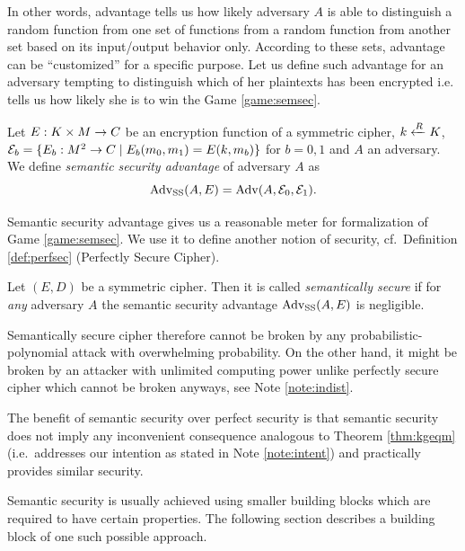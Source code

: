 In other words, advantage tells us how likely adversary $A$ is able to distinguish a random function from one set of functions from a random function from another set based on its input/output behavior only. According to these sets, advantage can be ``customized'' for a specific purpose. Let us define such advantage for an adversary tempting to distinguish which of her plaintexts has been encrypted i.e. tells us how likely she is to win the Game \ref{game:semsec}.

\begin{defn}
\label{def:ssadvant}
	Let $E: K\times M\rightarrow C$ be an encryption function of a symmetric cipher, $k\xleftarrow{R} K$, ${\cal E}_b = \{E_b:M^2\rightarrow C \mid E_b(m_0,m_1) = E(k,m_b)\}$ for $b=0,1$ and $A$ an adversary. We define {\em semantic security advantage} of adversary $A$ as
	\[
		\operatorname*{Adv_{SS}}(A,E) = \operatorname*{Adv}(A,{\cal E}_0,{\cal E}_1) .
	\]
\end{defn}

Semantic security advantage gives us a reasonable meter for formalization of Game \ref{game:semsec}. We use it to define another notion of security, cf.\ Definition \ref{def:perfsec} (Perfectly Secure Cipher).

\begin{defn}
\label{def:semsec}
	Let $(E,D)$ be a symmetric cipher. Then it is called {\em semantically secure} if for {\em any} adversary $A$ the semantic security advantage $\operatorname*{Adv_{SS}}(A,E)$ is negligible.
\end{defn}


Semantically secure cipher therefore cannot be broken by any probabilistic-polynomial attack with overwhelming probability. On the other hand, it might be broken by an attacker with unlimited computing power unlike perfectly secure cipher which cannot be broken anyways, see Note \ref{note:indist}.

The benefit of semantic security over perfect security is that semantic security does not imply any inconvenient consequence analogous to Theorem \ref{thm:kgeqm} (i.e.\ addresses our intention as stated in Note \ref{note:intent}) and practically provides similar security.

Semantic security is usually achieved using smaller building blocks which are required to have certain properties. The following section describes a building block of one such possible approach.


